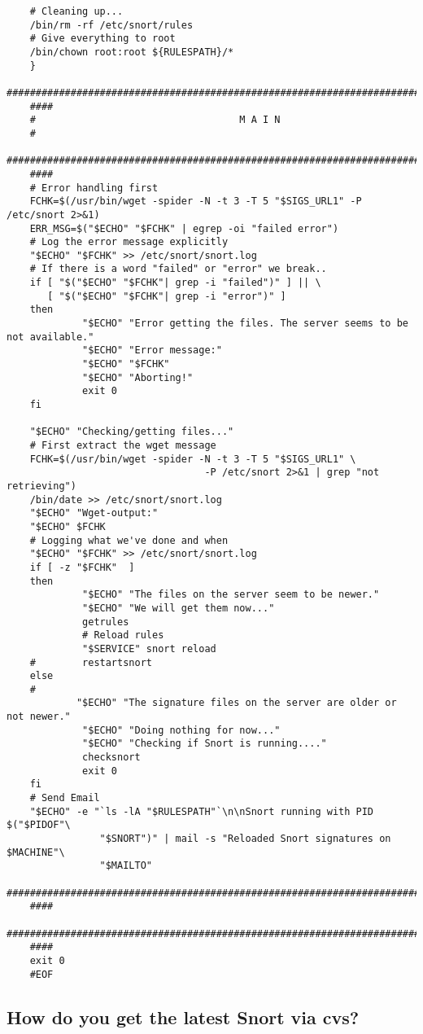 \documentclass{article}
\begin{document}
\begin{verbatim}
    # Cleaning up...
    /bin/rm -rf /etc/snort/rules
    # Give everything to root
    /bin/chown root:root ${RULESPATH}/*
    }
    ###########################################################################
    ####
    #                                   M A I N                                      
    #
    ###########################################################################
    ####
    # Error handling first
    FCHK=$(/usr/bin/wget -spider -N -t 3 -T 5 "$SIGS_URL1" -P /etc/snort 2>&1)
    ERR_MSG=$("$ECHO" "$FCHK" | egrep -oi "failed error")
    # Log the error message explicitly
    "$ECHO" "$FCHK" >> /etc/snort/snort.log
    # If there is a word "failed" or "error" we break..
    if [ "$("$ECHO" "$FCHK"| grep -i "failed")" ] || \
       [ "$("$ECHO" "$FCHK"| grep -i "error")" ]
    then
             "$ECHO" "Error getting the files. The server seems to be not available."
             "$ECHO" "Error message:"
             "$ECHO" "$FCHK"
             "$ECHO" "Aborting!"
             exit 0
    fi
     
    "$ECHO" "Checking/getting files..."
    # First extract the wget message
    FCHK=$(/usr/bin/wget -spider -N -t 3 -T 5 "$SIGS_URL1" \
                                  -P /etc/snort 2>&1 | grep "not retrieving")
    /bin/date >> /etc/snort/snort.log
    "$ECHO" "Wget-output:"
    "$ECHO" $FCHK
    # Logging what we've done and when
    "$ECHO" "$FCHK" >> /etc/snort/snort.log
    if [ -z "$FCHK"  ]
    then
             "$ECHO" "The files on the server seem to be newer."
             "$ECHO" "We will get them now..."
             getrules
             # Reload rules
             "$SERVICE" snort reload
    #        restartsnort
    else
    #
            "$ECHO" "The signature files on the server are older or not newer."
             "$ECHO" "Doing nothing for now..."
             "$ECHO" "Checking if Snort is running...."
             checksnort
             exit 0
    fi
    # Send Email
    "$ECHO" -e "`ls -lA "$RULESPATH"`\n\nSnort running with PID $("$PIDOF"\
                "$SNORT")" | mail -s "Reloaded Snort signatures on $MACHINE"\
                "$MAILTO"
    ###########################################################################
    ####
    ###########################################################################
    ####
    exit 0
    #EOF
\end{verbatim}

\subsection{How do you get the latest Snort via cvs?} \label{cvs}
\end{document}
